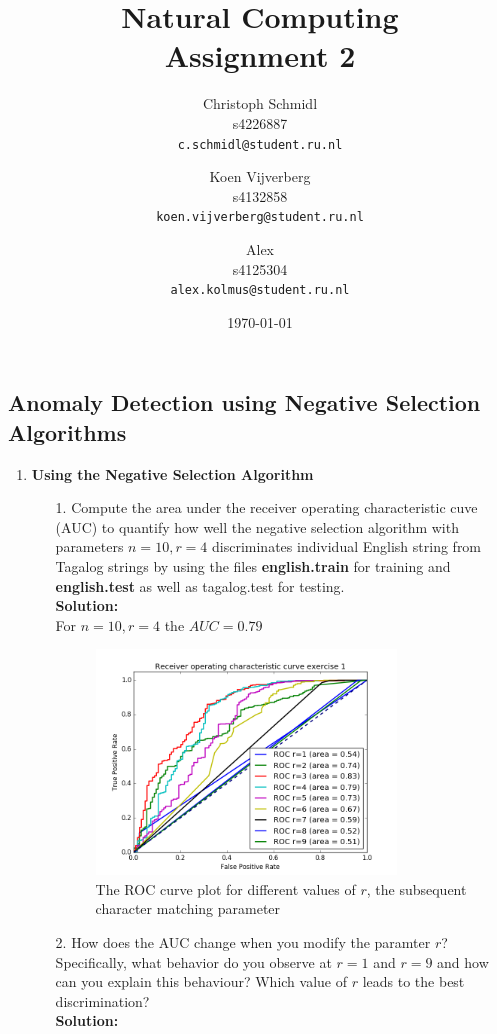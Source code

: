 \documentclass[a4paper]{article}
\title{Natural Computing\\Assignment 2}
\author{
  Christoph Schmidl\\ s4226887\\      \texttt{c.schmidl@student.ru.nl}
  \and
  Koen Vijverberg\\ s4132858\\     \texttt{koen.vijverberg@student.ru.nl}
  \and
  Alex\\	s4125304\\	\texttt{alex.kolmus@student.ru.nl}
}
\date{\today}
\begin{document}
\maketitle


\subsection*{Anomaly Detection using Negative Selection Algorithms}

\begin{enumerate}

	\item \textbf{Using the Negative Selection Algorithm}

	\begin{enumerate}
		\item[1.] Compute the area under the receiver operating characteristic cuve (AUC) to quantify how well the negative selection algorithm with parameters $n = 10, r = 4$ discriminates individual English string from Tagalog strings by using the files \textbf{english.train} for training and \textbf{english.test} as well as tagalog.test for testing.\\
		\textbf{Solution:}\\
		For $n = 10, r = 4$ the $AUC = 0.79$
		\begin{figure}[H]
	    \centering
  	    \includegraphics[width=0.8\textwidth]{images/ROC_exercise_1.png}
  	    \caption{The ROC curve plot for different values of $r$, the subsequent character matching parameter}
	    \end{figure}
		
		\item[2.] How does the AUC change when you modify the paramter $r$? Specifically, what behavior do you observe at $r = 1$ and $r = 9$ and how can you explain this behaviour? Which value of $r$ leads to the best discrimination?\\
		\textbf{Solution:}\\
		

\end{enumerate}
\end{enumerate}
\end{document}
